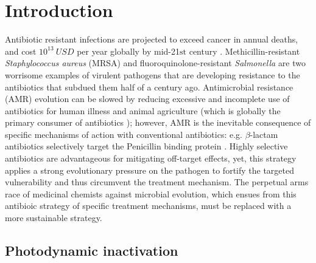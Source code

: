 \label{PDIpy_chapter}

\section{Introduction}
Antibiotic resistant infections are projected to exceed cancer in annual deaths, and cost $10^{13}~USD$ per year globally by mid-21$\text{st}$ century \cite{ONeill2014AntimicrobialNations}. Methicillin-resistant \textit{Staphylococcus aureus} (MRSA) \cite{Baines2015ConvergentAureus,Song2011SpreadStudy,Borg2007PrevalenceCountries} and fluoroquinolone-resistant \textit{Salmonella} \cite{Moghnieh2018EpidemiologyLeague} are two worrisome examples of virulent pathogens that are developing resistance to the antibiotics that subdued them half of a century ago. Antimicrobial resistance (AMR) evolution can be slowed by reducing excessive and incomplete use of antibiotics for human illness and animal agriculture (which is globally the primary consumer of antibiotics \cite{VanBoeckel2017ReducingAnimals,Eggleton2020TheWorld}); however, AMR is the inevitable consequence of specific mechanisms of action with conventional antibiotics: e.g. $\beta$-lactam antibiotics selectively target the Penicillin binding protein \cite{Hartman1984Low-affinityAureus}. Highly selective antibiotics are advantageous for mitigating off-target effects, yet, this strategy applies a strong evolutionary pressure on the pathogen to fortify the targeted vulnerability and thus circumvent the treatment mechanism. The perpetual arms race of medicinal chemists against microbial evolution, which ensues from this antibioic strategy of specific treatment mechanisms, must be replaced with a more sustainable strategy.

\subsection{Photodynamic inactivation}

